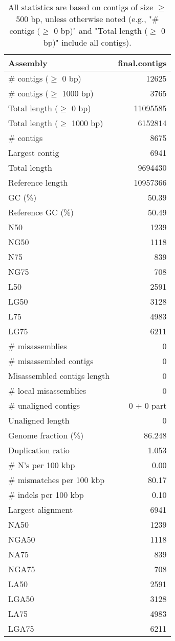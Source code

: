 \documentclass[12pt,a4paper]{article}
\begin{document}
\begin{table}[ht]
\begin{center}
\caption{All statistics are based on contigs of size $\geq$ 500 bp, unless otherwise noted (e.g., "\# contigs ($\geq$ 0 bp)" and "Total length ($\geq$ 0 bp)" include all contigs).}
\begin{tabular}{|l*{1}{|r}|}
\hline
Assembly & final.contigs \\ \hline
\# contigs ($\geq$ 0 bp) & 12625 \\ \hline
\# contigs ($\geq$ 1000 bp) & 3765 \\ \hline
Total length ($\geq$ 0 bp) & 11095585 \\ \hline
Total length ($\geq$ 1000 bp) & 6152814 \\ \hline
\# contigs & 8675 \\ \hline
Largest contig & 6941 \\ \hline
Total length & 9694430 \\ \hline
Reference length & 10957366 \\ \hline
GC (\%) & 50.39 \\ \hline
Reference GC (\%) & 50.49 \\ \hline
N50 & 1239 \\ \hline
NG50 & 1118 \\ \hline
N75 & 839 \\ \hline
NG75 & 708 \\ \hline
L50 & 2591 \\ \hline
LG50 & 3128 \\ \hline
L75 & 4983 \\ \hline
LG75 & 6211 \\ \hline
\# misassemblies & 0 \\ \hline
\# misassembled contigs & 0 \\ \hline
Misassembled contigs length & 0 \\ \hline
\# local misassemblies & 0 \\ \hline
\# unaligned contigs & 0 + 0 part \\ \hline
Unaligned length & 0 \\ \hline
Genome fraction (\%) & 86.248 \\ \hline
Duplication ratio & 1.053 \\ \hline
\# N's per 100 kbp & 0.00 \\ \hline
\# mismatches per 100 kbp & 80.17 \\ \hline
\# indels per 100 kbp & 0.10 \\ \hline
Largest alignment & 6941 \\ \hline
NA50 & 1239 \\ \hline
NGA50 & 1118 \\ \hline
NA75 & 839 \\ \hline
NGA75 & 708 \\ \hline
LA50 & 2591 \\ \hline
LGA50 & 3128 \\ \hline
LA75 & 4983 \\ \hline
LGA75 & 6211 \\ \hline
\end{tabular}
\end{center}
\end{table}
\end{document}
